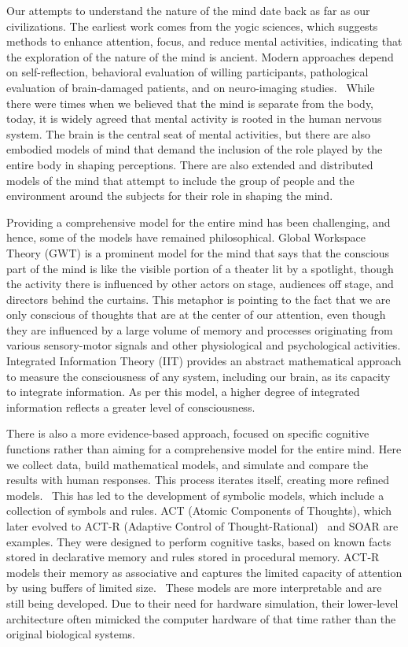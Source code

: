 \documentclass[reprint,amsmath,amssymb,apr,aip,onecolumn, 11pt]{revtex4-1}
\begin{document}
	Our attempts to understand the nature of the mind date back as far as our civilizations. The earliest work comes from the yogic sciences, which suggests methods to enhance attention, focus, and reduce mental activities, indicating that the exploration of the nature of the mind is ancient\cite{Vivekananda_1896}. Modern approaches depend on self-reflection, behavioral evaluation of willing participants, pathological evaluation of brain-damaged patients, and on neuro-imaging studies.  While there were times when we believed that the mind is separate from the body, today, it is widely agreed that mental activity is rooted in the human nervous system. The brain is the central seat of mental activities, but there are also embodied models of mind that demand the inclusion of the role played by the entire body in shaping perceptions. There are also extended and distributed models of the mind that attempt to include the group of people and the environment around the subjects for their role in shaping the mind. 
	
	Providing a comprehensive model for the entire mind has been challenging, and hence, some of the models have remained philosophical. Global Workspace Theory (GWT) is a prominent model for the mind that says that the conscious part of the mind is like the visible portion of a theater lit by a spotlight, though the activity there is influenced by other actors on stage,  audiences off stage, and directors behind the curtains. This metaphor is pointing to the fact that we are only conscious of thoughts that are at the center of our attention, even though they are influenced by a large volume of memory and processes originating from various sensory-motor signals and other physiological and psychological activities\cite{ Baars1988-BAAACT}. Integrated Information Theory (IIT) provides an abstract mathematical approach to measure the consciousness of any system, including our brain, as its capacity to integrate information\cite{ Tononi_2004_IIT}. As per this model, a higher degree of integrated information reflects a greater level of consciousness. 
	
	There is also a more evidence-based approach, focused on specific cognitive functions rather than aiming for a comprehensive model for the entire mind. Here we collect data, build mathematical models, and simulate and compare the results with human responses. This process iterates itself, creating more refined models.  This has led to the development of symbolic models, which include a collection of symbols and rules. ACT (Atomic Components of Thoughts), which later evolved to ACT-R (Adaptive Control of Thought-Rational)\cite{Anderson_1974, Anderson_1998}  and SOAR\cite{Newell_1990} are examples. They were designed to perform cognitive tasks, based on known facts stored in declarative memory and rules stored in procedural memory. ACT-R models their memory as associative and captures the limited capacity of attention by using buffers of limited size.  These models are more interpretable and are still being developed. Due to their need for hardware simulation, their lower-level architecture often mimicked the computer hardware of that time rather than the original biological systems.  
	
\end{document}

